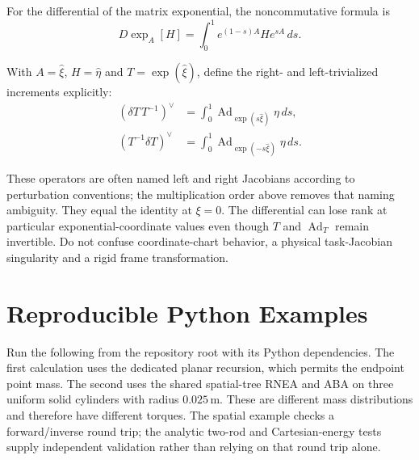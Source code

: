 For the differential of the matrix exponential, the noncommutative formula is
\begin{equation}
 D\exp_A[H]=\int_0^1e^{(1-s)A}He^{sA}\,ds.
 \label{eq:rnea_dexp}
\end{equation}

With $A=\widehat\xi$, $H=\widehat\eta$ and $T=\exp(\widehat\xi)$, define the right- and left-trivialized increments explicitly:
\begin{equation}
 \begin{aligned}
 (\delta T\,T^{-1})^{\vee}
 &=\int_0^1\operatorname{Ad}_{\exp(s\widehat\xi)}\eta\,ds,\\
 (T^{-1}\delta T)^{\vee}
 &=\int_0^1\operatorname{Ad}_{\exp(-s\widehat\xi)}\eta\,ds.
 \end{aligned}
 \label{eq:rnea_dexp_trivialization}
\end{equation}

These operators are often named left and right Jacobians according to perturbation conventions; the multiplication order above removes that naming ambiguity. They equal the identity at $\xi=0$. The differential can lose rank at particular exponential-coordinate values even though $T$ and $\operatorname{Ad}_T$ remain invertible. Do not confuse coordinate-chart behavior, a physical task-Jacobian singularity and a rigid frame transformation.

\section{Reproducible Python Examples}
\label{sec:python_rnea}

Run the following from the repository root with its Python dependencies. The first calculation uses the dedicated planar recursion, which permits the endpoint point mass. The second uses the shared spatial-tree RNEA and ABA on three uniform solid cylinders with radius $0.025\,\mathrm m$. These are different mass distributions and therefore have different torques. The spatial example checks a forward/inverse round trip; the analytic two-rod and Cartesian-energy tests supply independent validation rather than relying on that round trip alone.

